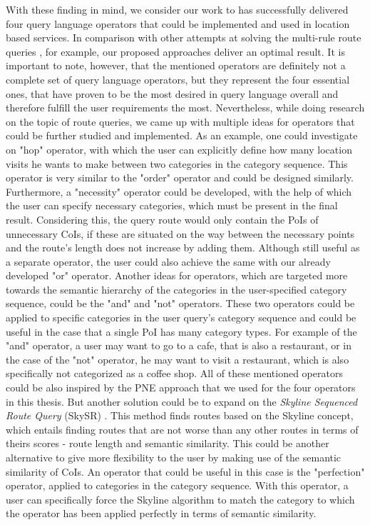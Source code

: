 With these finding in mind, we consider our work to has successfully delivered four query language operators that could be implemented and used in location based services. In comparison with other attempts at solving the multi-rule route queries \cite{multi}, for example, our proposed approaches deliver an optimal result. It is important to note, however, that the mentioned operators are definitely not a complete set of query language operators, but they represent the four essential ones, that have proven to be the most desired in query language overall and therefore fulfill the user requirements the most. Nevertheless, while doing research on the topic of route queries, we came up with multiple ideas for operators that could be further studied and implemented. As an example, one could investigate on "hop" operator, with which the user can explicitly define how many location visits he wants to make between two categories in the category sequence. This operator is very similar to the "order" operator and could be designed similarly. Furthermore, a "necessity" operator could be developed, with the help of which the user can specify necessary categories, which must be present in the final result. Considering this, the query route would only contain the PoIs of unnecessary CoIs, if these are situated on the way between the necessary points and the route's length does not increase by adding them. Although still useful as a separate operator, the user could also achieve the same with our already developed "or" operator. \newline
Another ideas for operators, which are targeted more towards the semantic hierarchy of the categories in the user-specified category sequence, could be the "and" and "not" operators. These two operators could be applied to specific categories in the user query's category sequence and could be useful in the case that a single PoI has many category types. For example of the "and" operator, a user may want to go to a cafe, that is also a restaurant, or in the case of the "not" operator, he may want to visit a restaurant, which is also specifically not categorized as a coffee shop. \newline
All of these mentioned operators could be also inspired by the PNE approach that we used for the four operators in this thesis. But another solution could be to expand on the \textit{Skyline Sequenced Route Query} (SkySR) \cite{skyline}. This method finds routes based on the Skyline concept, which entails finding routes that are not worse than any other routes in terms of theirs scores - route length and semantic similarity. This could be another alternative to give more flexibility to the user by making use of the semantic similarity of CoIs. An operator that could be useful in this case is the "perfection" operator, applied to categories in the category sequence. With this operator, a user can specifically force the Skyline algorithm to match the category to which the operator has been applied perfectly in terms of semantic similarity. \newline
